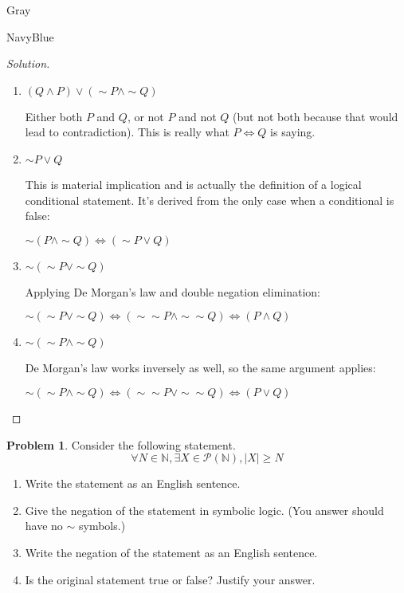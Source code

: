 \documentclass[12pt]{amsart}
\newcounter{problem_number}[section]
\theoremstyle{named}
\newenvironment{soln}
{\begin{color}{Gray}\begin{framed}\begin{color}{NavyBlue}\begin{proof}[Solution]
\doublespacing}
{\end{proof}\end{color}\end{framed}\end{color}}
\theoremstyle{definition}
\newtheorem{problem}{Problem}
\newcommand{\N}{\mathbb N}
\begin{document}
\begin{soln}
	\phantom{ }
	\begin{enumerate}
		\item $(Q \land P) \lor (\sim P \land \sim Q)$
		
		\noindent Either both $P$ and $Q$, or not $P$ and not $Q$ (but not both because
		that would lead to contradiction). This is really what $P \Leftrightarrow Q$ is 
		saying.

		\phantom{ }



		\item $\sim P \lor Q$
		
		\noindent This is material implication and is actually the definition of a 
		logical conditional statement. It's derived from the only case when a 
		conditional is false: 
		
		\noindent $\sim (P \land \sim Q) \iff (\sim P \lor Q)$

		\phantom{ }



		\item $\sim (\sim P \lor \sim Q)$
		
		\noindent Applying De Morgan's law and double negation elimination: 
		
		\noindent $\sim (\sim P \lor \sim Q) \iff (\sim \sim P \land \sim \sim Q)
		\iff (P \land Q)$

		\phantom{ }


		
		\item $\sim (\sim P \land \sim Q)$
		
		\noindent De Morgan's law works inversely as well, so the same argument
		applies:
		
		\noindent $\sim (\sim P \land \sim Q) \iff (\sim \sim P \lor \sim \sim Q)
		\iff (P \lor Q)$
	\end{enumerate}
\end{soln}
\begin{problem}
	Consider the following statement.
$$\forall N\in\N,\exists X\in\mathscr P(\N),|X|\geq N$$

	\begin{enumerate}
		\item Write the statement as an English sentence.
		\item Give the negation of the statement in symbolic logic. (You answer should have no $\sim$ symbols.)
		\item Write the negation of the statement as an English sentence.
		\item Is the original statement true or false? Justify your answer.
	\end{enumerate}
\end{problem}
\end{document}
